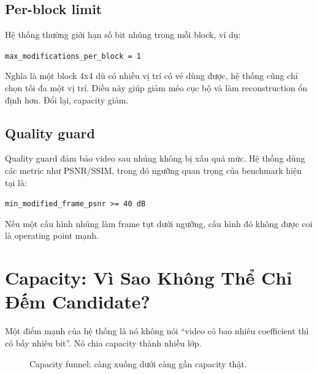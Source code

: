 \documentclass[11pt,a4paper]{article}
\begin{document}
\subsection{Per-block limit}

Hệ thống thường giới hạn số bit nhúng trong mỗi block, ví dụ:

\begin{center}
\texttt{max\_modifications\_per\_block = 1}
\end{center}

Nghĩa là một block 4x4 dù có nhiều vị trí có vẻ dùng được, hệ thống cũng chỉ
chọn tối đa một vị trí. Điều này giúp giảm méo cục bộ và làm reconstruction ổn
định hơn. Đổi lại, capacity giảm.

\subsection{Quality guard}

Quality guard đảm bảo video sau nhúng không bị xấu quá mức. Hệ thống dùng các
metric như PSNR/SSIM, trong đó ngưỡng quan trọng của benchmark hiện tại là:

\begin{center}
\texttt{min\_modified\_frame\_psnr >= 40 dB}
\end{center}

Nếu một cấu hình nhúng làm frame tụt dưới ngưỡng, cấu hình đó không được coi là
operating point mạnh.

\section{Capacity: Vì Sao Không Thể Chỉ Đếm Candidate?}

Một điểm mạnh của hệ thống là nó không nói ``video có bao nhiêu coefficient thì
có bấy nhiêu bit''. Nó chia capacity thành nhiều lớp.

\begin{figure}[H]
\centering
{}
\caption{Capacity funnel: càng xuống dưới càng gần capacity thật.}
\label{fig:capacity-funnel}
\end{figure}
\end{document}
